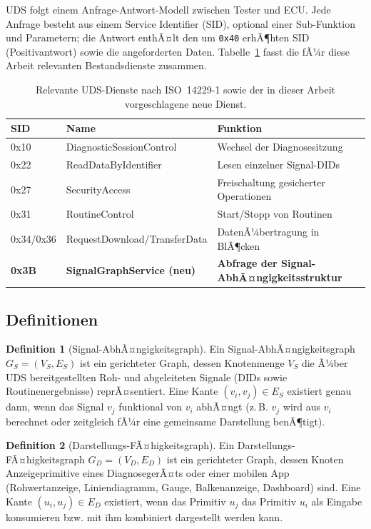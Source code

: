 ﻿\documentclass[a4paper,12pt]{article}
\theoremstyle{definition}
\newtheorem{definition}{Definition}
\begin{document}
UDS folgt einem Anfrage-Antwort-Modell zwischen Tester und ECU. Jede Anfrage besteht aus einem Service Identifier (SID), optional einer Sub-Funktion und Parametern; die Antwort enthÃ¤lt den um \texttt{0x40} erhÃ¶hten SID (Positivantwort) sowie die angeforderten Daten. Tabelle~\ref{tab:uds-services} fasst die fÃ¼r diese Arbeit relevanten Bestandsdienste zusammen.

\begin{table}[h]
\centering
\small
\begin{tabular}{@{}llp{6.5cm}@{}}
\toprule
SID & Name & Funktion \\
\midrule
0x10 & DiagnosticSessionControl & Wechsel der Diagnosesitzung \\
0x22 & ReadDataByIdentifier & Lesen einzelner Signal-DIDs \\
0x27 & SecurityAccess & Freischaltung gesicherter Operationen \\
0x31 & RoutineControl & Start/Stopp von Routinen \\
0x34/0x36 & RequestDownload/TransferData & DatenÃ¼bertragung in BlÃ¶cken \\
\textbf{0x3B} & \textbf{SignalGraphService (neu)} & \textbf{Abfrage der Signal-AbhÃ¤ngigkeitsstruktur} \\
\bottomrule
\end{tabular}
\caption{Relevante UDS-Dienste nach ISO~14229-1 sowie der in dieser Arbeit vorgeschlagene neue Dienst.}
\label{tab:uds-services}
\end{table}

\subsection{Definitionen}

\begin{definition}[Signal-AbhÃ¤ngigkeitsgraph]
	Ein Signal-AbhÃ¤ngigkeitsgraph $G_S = (V_S, E_S)$ ist ein gerichteter Graph, dessen Knotenmenge $V_S$ die Ã¼ber UDS bereitgestellten Roh- und abgeleiteten Signale (DIDs sowie Routinenergebnisse) reprÃ¤sentiert. Eine Kante $(v_i, v_j) \in E_S$ existiert genau dann, wenn das Signal $v_j$ funktional von $v_i$ abhÃ¤ngt (z.\,B. $v_j$ wird aus $v_i$ berechnet oder zeitgleich fÃ¼r eine gemeinsame Darstellung benÃ¶tigt).
\end{definition}

\begin{definition}[Darstellungs-FÃ¤higkeitsgraph]
	Ein Darstellungs-FÃ¤higkeitsgraph $G_D = (V_D, E_D)$ ist ein gerichteter Graph, dessen Knoten Anzeigeprimitive eines DiagnosegerÃ¤ts oder einer mobilen App (Rohwertanzeige, Liniendiagramm, Gauge, Balkenanzeige, Dashboard) sind. Eine Kante $(u_i, u_j) \in E_D$ existiert, wenn das Primitiv $u_j$ das Primitiv $u_i$ als Eingabe konsumieren bzw. mit ihm kombiniert dargestellt werden kann.
\end{definition}
\end{document}

